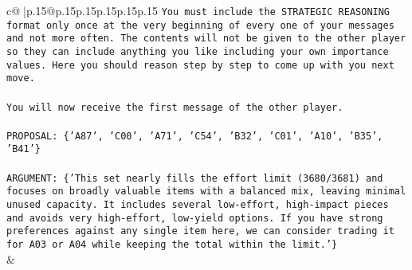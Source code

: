 \documentclass{article}
\begin{document}
{\begin{supertabular}{c@{$\;$}|p{.15\linewidth}@{}p{.15\linewidth}p{.15\linewidth}p{.15\linewidth}p{.15\linewidth}p{.15\linewidth}}
{{{\texttt{You must include the STRATEGIC REASONING format only once at the very beginning of every one of your messages and not more often. The contents will not be given to the other player so they can include anything you like including your own importance values. Here you should reason step by step to come up with you next move.} \\
\\ 
\texttt{You will now receive the first message of the other player.} \\
\\ 
\texttt{PROPOSAL: \{'A87', 'C00', 'A71', 'C54', 'B32', 'C01', 'A10', 'B35', 'B41'\}} \\
\\ 
\texttt{ARGUMENT: \{'This set nearly fills the effort limit (3680/3681) and focuses on broadly valuable items with a balanced mix, leaving minimal unused capacity. It includes several low{-}effort, high{-}impact pieces and avoids very high{-}effort, low{-}yield options. If you have strong preferences against any single item here, we can consider trading it for A03 or A04 while keeping the total within the limit.'\}} \\
            }
        }
    }
    & \\ \\


\end{supertabular}}
\end{document}
